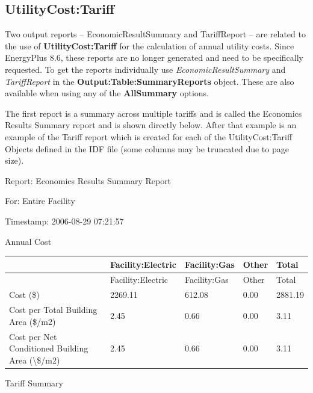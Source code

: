 \subsection{UtilityCost:Tariff}\label{utilitycosttariff}

Two output reports -- EconomicResultSummary and TariffReport -- are related to the use of \textbf{UtilityCost:Tariff} for the calculation of annual utility costs.
Since EnergyPlus 8.6, these reports are no longer generated and need to be specifically requested.
To get the reports individually use \emph{EconomicResultSummary} and \emph{TariffReport} in the \textbf{Output:Table:SummaryReports} object.
These are also available when using any of the \textbf{AllSummary} options.

The first report is a summary across multiple tariffs and is called the Economics Results Summary report and is shown directly below.
After that example is an example of the Tariff report which is created for each of the UtilityCost:Tariff Objects defined in the IDF file (some columns may be truncated due to page size).

Report: Economics Results Summary Report

For: Entire Facility

Timestamp: 2006-08-29 07:21:57

Annual Cost

\begin{longtable}[c]{>{\raggedright}p{1.2in}>{\raggedright}p{1.2in}>{\raggedright}p{1.2in}>{\raggedright}p{1.2in}>{\raggedright}p{1.2in}}
\toprule
~ & Facility:Electric & Facility:Gas & Other & Total \tabularnewline
\midrule
\endfirsthead

\toprule
~ & Facility:Electric & Facility:Gas & Other & Total \tabularnewline
\midrule
\endhead

Cost (\$) & 2269.11 & 612.08 & 0.00 & 2881.19 \tabularnewline
Cost per Total Building Area (\$/m2) & 2.45 & 0.66 & 0.00 & 3.11 \tabularnewline
Cost per Net Conditioned Building Area (\textbackslash\$/m2) & 2.45 & 0.66 & 0.00 & 3.11 \tabularnewline
\bottomrule
\end{longtable}

Tariff Summary

